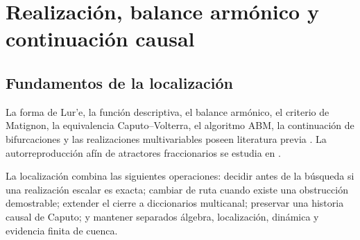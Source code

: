 \section{Realización, balance armónico y continuación causal}
\label{part:theory}

\subsection{Fundamentos de la localización}
\label{sec:theory-attribution}

La forma de Lur'e, la función descriptiva, el balance armónico, el criterio de
Matignon, la equivalencia Caputo--Volterra, el algoritmo ABM, la continuación
de bifurcaciones y las realizaciones multivariables poseen literatura previa
\cite{Leonov2013HiddenAttractors,LeonovKuznetsov2013,Matignon1996,
DiethelmFordFreed2002,bonani1999,rogov2019}. La autorreproducción afín de
atractores fraccionarios se estudia en \cite{sayed2020}.

La localización combina las siguientes operaciones:
decidir antes de la búsqueda si una realización escalar es
exacta; cambiar de ruta cuando existe una obstrucción demostrable; extender el
cierre a diccionarios multicanal; preservar una historia causal de Caputo; y
mantener separados álgebra, localización, dinámica y evidencia finita de
cuenca.

